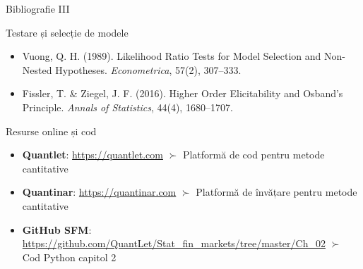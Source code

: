 \documentclass[9pt, aspectratio=169, t]{beamer}
\theoremstyle{definition}
\newenvironment{cminipage}[1]{%
    \par\noindent\hfill\begin{minipage}{#1}\ignorespaces
}{%
    \end{minipage}\hfill\null\par
}
\begin{document}
\begin{frame}{Bibliografie III}
    \begin{cminipage}{0.95\textwidth}
    \begin{block}{Testare și selecție de modele}
        {\small
        \begin{itemize}\setlength{\itemsep}{0pt}
            \item Vuong, Q. H. (1989). Likelihood Ratio Tests for Model Selection and Non-Nested Hypotheses. \textit{Econometrica}, 57(2), 307--333.
            \item Fissler, T. \& Ziegel, J. F. (2016). Higher Order Elicitability and Osband's Principle. \textit{Annals of Statistics}, 44(4), 1680--1707.
        \end{itemize}
        }
    \end{block}

    \begin{exampleblock}{Resurse online și cod}
        {\small
        \begin{itemize}\setlength{\itemsep}{0pt}
            \item \textbf{Quantlet}: \url{https://quantlet.com} $\succ$ Platformă de cod pentru metode cantitative
            \item \textbf{Quantinar}: \url{https://quantinar.com} $\succ$ Platformă de învățare pentru metode cantitative
            \item \textbf{GitHub SFM}: \url{https://github.com/QuantLet/Stat_fin_markets/tree/master/Ch_02} $\succ$ Cod Python capitol 2
        \end{itemize}
        }
    \end{exampleblock}
    \end{cminipage}
\end{frame}
\end{document}
